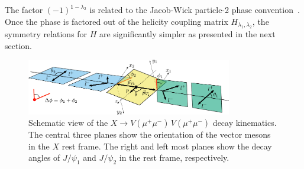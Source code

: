 \documentclass[prd,preprintnumbers,floatfix,
nofootinbib,superscriptaddress]{revtex4}
\begin{document}
The factor $(-1)^{1-\lambda_2}$ is related to the Jacob-Wick particle-2 phase convention~\cite{Jacob:1959at}.
Once the phase is factored out of the helicity coupling matrix $H_{\lambda_1,\lambda_2}$,
the symmetry relations for $H$ are significantly simpler as presented in the next section.
\begin{figure}
  \includegraphics[width=0.8\textwidth]{angles.pdf}
  \caption{Schematic view of the $X\to V(\mu^+\mu^-)\,V(\mu^+\mu^-)$ decay kinematics.
  The central three planes show the orientation of the vector mesons in the $X$ rest frame.
  The right and left most planes show the decay angles of $J/\psi_1$ and $J/\psi_2$ in the rest frame, respectively.
  }
  \label{fig:decay}
\end{figure}



%
\end{document}
